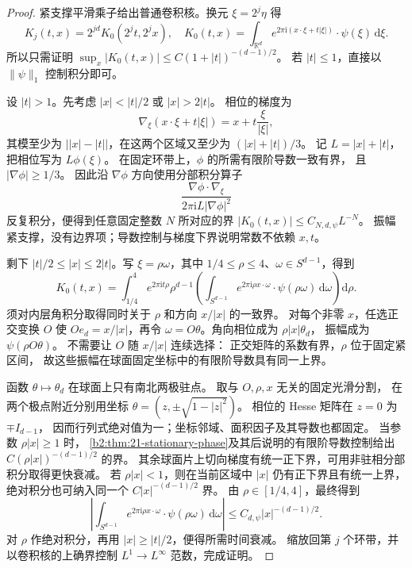 \begin{proof}
紧支撑平滑乘子给出普通卷积核。换元 \(\xi=2^j\eta\) 得
\[
 K_j(t,x)=2^{jd}K_0(2^jt,2^jx),
 \quad
 K_0(t,x)=\int_{\mathbb R^d}
 e^{2\pi\mathrm i(x\cdot\xi+t|\xi|)}\cdot\psi(\xi)\,\mathrm d\xi.
\]
所以只需证明
\(\sup_x|K_0(t,x)|\le C(1+|t|)^{-(d-1)/2}\)。
若 \(|t|\le1\)，直接以 \(\|\psi\|_1\) 控制积分即可。

设 \(|t|>1\)。先考虑 \(|x|<|t|/2\) 或 \(|x|>2|t|\)。
相位的梯度为
\[
 \nabla_\xi(x\cdot\xi+t|\xi|)
 =x+t\frac{\xi}{|\xi|},
\]
其模至少为 \(\bigl||x|-|t|\bigr|\)，在这两个区域又至少为
\((|x|+|t|)/3\)。
记 \(L=|x|+|t|\)，把相位写为 \(L\phi(\xi)\)。
在固定环带上，\(\phi\) 的所需有限阶导数一致有界，
且 \(|\nabla\phi|\ge1/3\)。
因此沿 \(\nabla\phi\) 方向使用分部积分算子
\[
 \frac{\nabla\phi\cdot\nabla_\xi}
      {2\pi\mathrm iL|\nabla\phi|^2}
\]
反复积分，便得到任意固定整数 \(N\) 所对应的界
\(|K_0(t,x)|\le C_{N,d,\psi}L^{-N}\)。
振幅紧支撑，没有边界项；导数控制与梯度下界说明常数不依赖 \(x,t\)。

剩下 \(|t|/2\le|x|\le2|t|\)。写 \(\xi=\rho\omega\)，其中
\(1/4\le\rho\le4\)、\(\omega\in S^{d-1}\)，得到
\[
 K_0(t,x)=\int_{1/4}^4 e^{2\pi\mathrm it\rho}\rho^{d-1}
 \left(\int_{S^{d-1}}e^{2\pi\mathrm i\rho x\cdot\omega}
             \cdot\psi(\rho\omega)\,\mathrm d\omega\right)\mathrm d\rho.
\]
须对内层角积分取得同时关于 \(\rho\) 和方向 \(x/|x|\) 的一致界。
对每个非零 \(x\)，任选正交变换 \(O\) 使 \(Oe_d=x/|x|\)，再令
\(\omega=O\theta\)。角向相位成为 \(\rho|x|\theta_d\)，
振幅成为 \(\psi(\rho O\theta)\)。
不需要让 \(O\) 随 \(x/|x|\) 连续选择：
正交矩阵的系数有界，\(\rho\) 位于固定紧区间，
故这些振幅在球面固定坐标中的有限阶导数具有同一上界。

函数 \(\theta\mapsto\theta_d\) 在球面上只有南北两极驻点。
取与 \(O,\rho,x\) 无关的固定光滑分割，
在两个极点附近分别用坐标
\(\theta=(z,\pm\sqrt{1-|z|^2})\)。
相位的 Hesse 矩阵在 \(z=0\) 为 \(\mp I_{d-1}\)，
因而行列式绝对值为一；坐标邻域、面积因子及其导数也都固定。
当参数 \(\rho|x|\ge1\) 时，
\cref{b2:thm:21-stationary-phase}及其后说明的有限阶导数控制给出
\(C(\rho|x|)^{-(d-1)/2}\) 的界。
其余球面片上切向梯度有统一正下界，可用非驻相分部积分取得更快衰减。
若 \(\rho|x|<1\)，则在当前区域中 \(|x|\) 仍有正下界且有统一上界，
绝对积分也可纳入同一个 \(C|x|^{-(d-1)/2}\) 界。
由 \(\rho\in[1/4,4]\)，最终得到
\[
 \left|\int_{S^{d-1}}e^{2\pi\mathrm i\rho x\cdot\omega}
                    \cdot\psi(\rho\omega)\,\mathrm d\omega\right|
 \le C_{d,\psi}|x|^{-(d-1)/2}.
\]
对 \(\rho\) 作绝对积分，再用 \(|x|\ge|t|/2\)，便得所需时间衰减。
缩放回第 \(j\) 个环带，并以卷积核的上确界控制
\(L^1\to L^\infty\) 范数，完成证明。
\end{proof}

